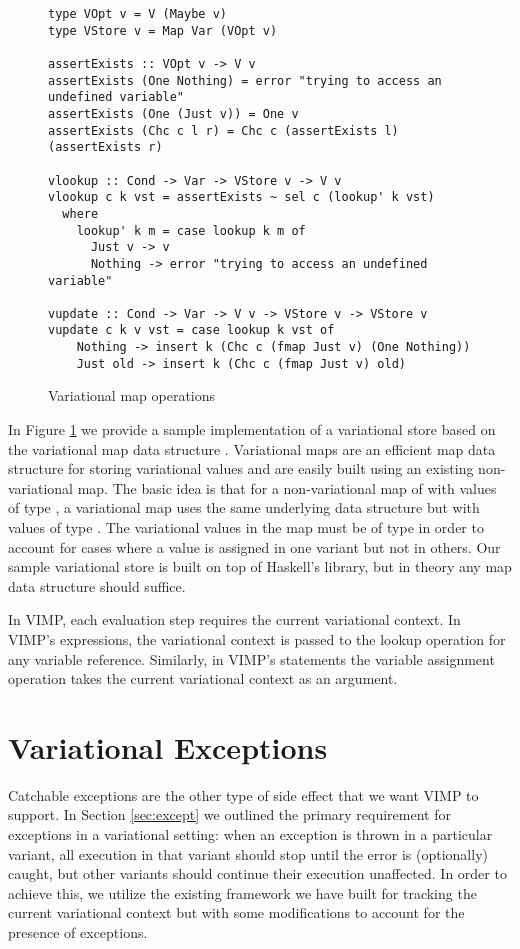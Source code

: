 \documentclass[12pt,oneside]{book}
\begin{document}
\begin{figure}
\begin{lstlisting}
type VOpt v = V (Maybe v)
type VStore v = Map Var (VOpt v)

assertExists :: VOpt v -> V v
assertExists (One Nothing) = error "trying to access an undefined variable"
assertExists (One (Just v)) = One v
assertExists (Chc c l r) = Chc c (assertExists l) (assertExists r)

vlookup :: Cond -> Var -> VStore v -> V v
vlookup c k vst = assertExists ~ sel c (lookup' k vst)
  where
    lookup' k m = case lookup k m of
      Just v -> v
      Nothing -> error "trying to access an undefined variable"

vupdate :: Cond -> Var -> V v -> VStore v -> VStore v
vupdate c k v vst = case lookup k vst of
    Nothing -> insert k (Chc c (fmap Just v) (One Nothing))
    Just old -> insert k (Chc c (fmap Just v) old)
\end{lstlisting}
\caption{Variational map operations}
\label{fig:varmap}
\end{figure}

In Figure \ref{fig:varmap} we provide a sample implementation of a variational store based on the variational map data structure \cite{varwhile, walkingshaw2014variational}.
Variational maps are an efficient map data structure for storing variational values and are easily built using an existing non-variational map. The basic idea
is that for a non-variational map of with values of type , a variational map uses the same underlying data structure but with values of type .
The variational values in the map must be of type  in order to account for cases where a value is assigned in one variant but not in others. Our sample
variational store is built on top of Haskell's  library, but in theory any map data structure should suffice.

In VIMP, each evaluation step requires the current variational context. In VIMP's expressions, the variational context is passed to the lookup operation for any
variable reference. Similarly, in VIMP's statements the variable assignment operation takes the current variational context as an argument.

\section{Variational Exceptions}
\label{sec:varexcept}

Catchable exceptions are the other type of side effect that we want VIMP to support. In Section \ref{sec:except} we outlined the primary requirement for exceptions
in a variational setting: when an exception is thrown in a particular variant, all execution in that variant should stop until the error is (optionally) caught, but other variants
should continue their execution unaffected. In order to achieve this, we utilize the existing framework we have built for tracking the current variational context but with some
modifications to account for the presence of exceptions.
\end{document}

